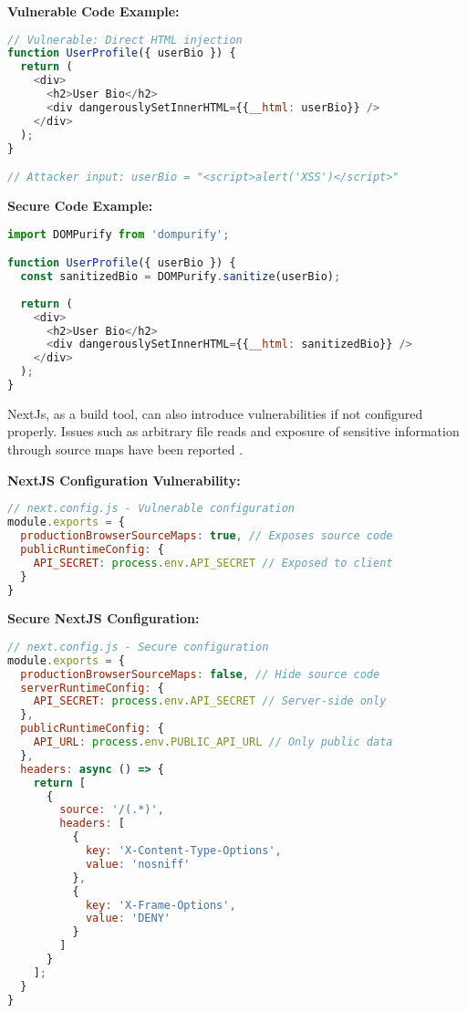 \documentclass[conference]{IEEEtran}
\begin{document}
\textbf{Vulnerable Code Example:}

\begin{lstlisting}[language=JavaScript, caption=Vulnerable React component susceptible to XSS]
// Vulnerable: Direct HTML injection
function UserProfile({ userBio }) {
  return (
    <div>
      <h2>User Bio</h2>
      <div dangerouslySetInnerHTML={{__html: userBio}} />
    </div>
  );
}

// Attacker input: userBio = "<script>alert('XSS')</script>"
\end{lstlisting}

\newpage

\textbf{Secure Code Example:}

\begin{lstlisting}[language=JavaScript, caption=Secure React component with XSS protection]
import DOMPurify from 'dompurify';

function UserProfile({ userBio }) {
  const sanitizedBio = DOMPurify.sanitize(userBio);
  
  return (
    <div>
      <h2>User Bio</h2>
      <div dangerouslySetInnerHTML={{__html: sanitizedBio}} />
    </div>
  );
}
\end{lstlisting}

NextJs, as a build tool, can also introduce vulnerabilities if not configured properly. Issues such as arbitrary file reads and exposure of sensitive information through source maps have been reported \cite{NextJsFlaw}.

\textbf{NextJS Configuration Vulnerability:}

\begin{lstlisting}[language=JavaScript, caption=Insecure NextJS configuration]
// next.config.js - Vulnerable configuration
module.exports = {
  productionBrowserSourceMaps: true, // Exposes source code
  publicRuntimeConfig: {
    API_SECRET: process.env.API_SECRET // Exposed to client
  }
}
\end{lstlisting}

\textbf{Secure NextJS Configuration:}

\begin{lstlisting}[language=JavaScript, caption=Secure NextJS configuration]
// next.config.js - Secure configuration
module.exports = {
  productionBrowserSourceMaps: false, // Hide source code
  serverRuntimeConfig: {
    API_SECRET: process.env.API_SECRET // Server-side only
  },
  publicRuntimeConfig: {
    API_URL: process.env.PUBLIC_API_URL // Only public data
  },
  headers: async () => {
    return [
      {
        source: '/(.*)',
        headers: [
          {
            key: 'X-Content-Type-Options',
            value: 'nosniff'
          },
          {
            key: 'X-Frame-Options',
            value: 'DENY'
          }
        ]
      }
    ];
  }
}
\end{lstlisting}
\end{document}
